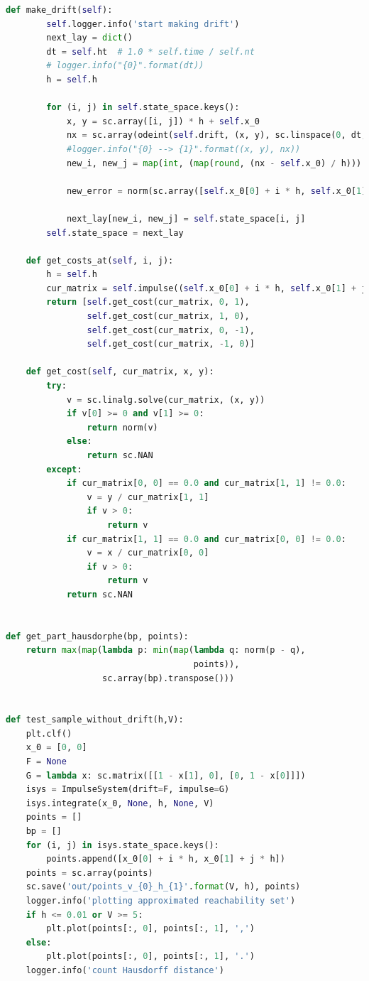 \documentclass[a4paper,12pt]{article}
\begin{document}
\begin{lstlisting}[language=Python,
caption={Интерфейс Impulse System}]
    def make_drift(self):
        self.logger.info('start making drift')
        next_lay = dict()
        dt = self.ht  # 1.0 * self.time / self.nt
        # logger.info("{0}".format(dt))
        h = self.h

        for (i, j) in self.state_space.keys():
            x, y = sc.array([i, j]) * h + self.x_0
            nx = sc.array(odeint(self.drift, (x, y), sc.linspace(0, dt, 10))[-1])
            #logger.info("{0} --> {1}".format((x, y), nx))
            new_i, new_j = map(int, (map(round, (nx - self.x_0) / h)))

            new_error = norm(sc.array([self.x_0[0] + i * h, self.x_0[1] + j * h]) - nx)

            next_lay[new_i, new_j] = self.state_space[i, j]
        self.state_space = next_lay

    def get_costs_at(self, i, j):
        h = self.h
        cur_matrix = self.impulse((self.x_0[0] + i * h, self.x_0[1] + j * h))
        return [self.get_cost(cur_matrix, 0, 1),
                self.get_cost(cur_matrix, 1, 0),
                self.get_cost(cur_matrix, 0, -1),
                self.get_cost(cur_matrix, -1, 0)]

    def get_cost(self, cur_matrix, x, y):
        try:
            v = sc.linalg.solve(cur_matrix, (x, y))
            if v[0] >= 0 and v[1] >= 0:
                return norm(v)
            else:
                return sc.NAN
        except:
            if cur_matrix[0, 0] == 0.0 and cur_matrix[1, 1] != 0.0:
                v = y / cur_matrix[1, 1]
                if v > 0:
                    return v
            if cur_matrix[1, 1] == 0.0 and cur_matrix[0, 0] != 0.0:
                v = x / cur_matrix[0, 0]
                if v > 0:
                    return v
            return sc.NAN


def get_part_hausdorphe(bp, points):
    return max(map(lambda p: min(map(lambda q: norm(p - q),
                                     points)),
                   sc.array(bp).transpose()))


def test_sample_without_drift(h,V):
    plt.clf()
    x_0 = [0, 0]
    F = None
    G = lambda x: sc.matrix([[1 - x[1], 0], [0, 1 - x[0]]])
    isys = ImpulseSystem(drift=F, impulse=G)
    isys.integrate(x_0, None, h, None, V)
    points = []
    bp = []
    for (i, j) in isys.state_space.keys():
        points.append([x_0[0] + i * h, x_0[1] + j * h])
    points = sc.array(points)
    sc.save('out/points_v_{0}_h_{1}'.format(V, h), points)
    logger.info('plotting approximated reachability set')
    if h <= 0.01 or V >= 5:
        plt.plot(points[:, 0], points[:, 1], ',')
    else:
        plt.plot(points[:, 0], points[:, 1], '.')
    logger.info('count Hausdorff distance')


\end{lstlisting}
\end{document}
